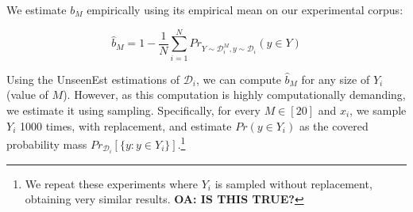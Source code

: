 \documentclass[letter,11pt]{article}
\begin{document}

                We estimate $b_M$ empirically using its empirical mean on our experimental corpus:

                \begin{footnotesize}
		\begin{equation*}
		\hat{b}_M = 1 - \frac{1}{N}\sum_{i=1}^N Pr_{Y \sim \mathcal{D}_i^M, y \sim \mathcal{D}_i}(y \in Y)
		\end{equation*}
                \end{footnotesize}
                
		Using the {\sc UnseenEst} estimations of $\mathcal{D}_i$, we can compute $\hat{b}_M$
                for any size of $Y_i$ (value of $M$). 
		However, as this computation is highly computationally demanding, we estimate it using
		sampling. Specifically, for every $M\in[20]$ and $x_i$, we sample $Y_i$ 1000 times,
                with replacement, and estimate $Pr(y \in Y_i)$ as the covered probability mass
                $Pr_{\mathcal{D}_i}[\{y: y \in Y_i\}]$.\footnote{We repeat these experiments where $Y_i$
                  is sampled without replacement, obtaining very similar results. {\bf OA: IS THIS TRUE?}}

		
  
		
		
\end{document}
